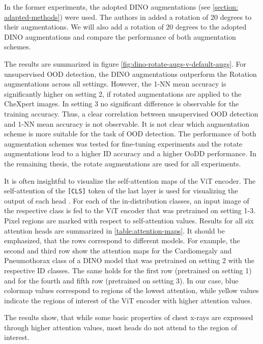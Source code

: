 In the former experiments, the adopted DINO augmentations (see \ref{section: adapted-methods}) were used.
The authors in \citep{Azizi2021} added a rotation of 20 degrees to their augmentations.
We will also add a rotation of 20 degrees to the adopted DINO augmentations and compare the performance of both augmentation schemes.
\par
The results are summarized in figure \ref{fig:dino-rotate-augs-v-default-augs}.
For unsupervised OOD detection, the DINO augmentations outperform the Rotation augmentations across all settings.
However, the 1-NN mean accuracy is significantly higher on setting 2, if rotated augmentations are applied to the CheXpert images.
In setting 3 no significant difference is observable for the training accuracy.
Thus, a clear correlation between unsupervised OOD detection and 1-NN mean accuracy is not observable.
It is not clear which augmentation scheme is more suitable for the task of OOD detection.
The performance of both augmentation schemes was tested for fine-tuning experiments and the rotate augmentations lead to a higher ID accuracy and a higher OoDD performance. 
In the remaining thesis, the rotate augmentations are used for all experiments.
\par
It is often insightful to visualize the self-attention maps of the ViT encoder.
The self-attention of the \texttt{[CLS]} token of the last layer is used for visualizing the output of each head \citep{Caron2021,Dosovitskiy2020}.
For each of the in-distribution classes, an input image of the respective class is fed to the ViT encoder that was pretrained on setting 1-3.
Pixel regions are marked with respect to self-attention values.
Results for all six attention heads are summarized in \ref{table:attention-maps}.
It should be emphasized, that the rows correspond to different models.
For example, the second and third row show the attention maps for the Cardiomegaly and Pneumothorax class of a DINO model that was pretrained on setting 2 with the respective ID classes.
The same holds for the first row (pretrained on setting 1) and for the fourth and fifth row (pretrained on setting 3).
In our case, blue colormap values correspond to regions of the lowest attention, while yellow values indicate the regions of interest of the ViT encoder with higher attention values.
\par
The results show, that while some basic properties of chest x-rays are expressed through higher attention values, most heads do not attend to the region of interest.
